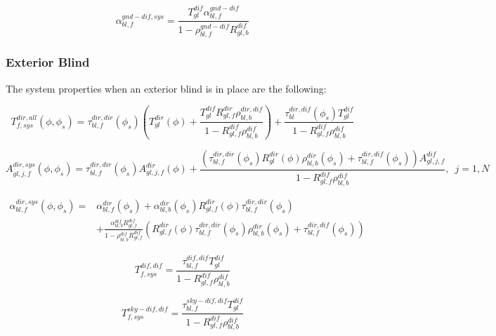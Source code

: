 \begin{equation}
\alpha_{bl,f}^{gnd - dif,sys} = \frac{{T_{gl}^{dif}\alpha_{bl,f}^{gnd - dif}}}{{1 - \rho_{bl,f}^{gnd - dif}R_{gl,b}^{dif}}}
\end{equation}

\subsubsection{Exterior Blind}\label{exterior-blind}

The system properties when an exterior blind is in place are the following:

\begin{equation}
T_{f,sys}^{dir,all}(\phi ,{\phi_s}) = \tau_{bl,f}^{dir,dir}({\phi_s})\left( {T_{gl}^{dir}(\phi ) + \frac{{T_{gl}^{dif}R_{gl,f}^{dir}\rho_{bl,b}^{dir,dif}}}{{1 - R_{gl,f}^{dif}\rho_{bl,b}^{dif}}}} \right) + \frac{{\tau_{bl}^{dir,dif}({\phi_s})T_{gl}^{dif}}}{{1 - R_{gl,f}^{dif}\rho_{bl,b}^{dif}}}
\end{equation}

\begin{equation}
A_{gl,j,f}^{dir,sys}(\phi ,\phi_s) =
     \tau_{bl,f}^{dir,dir}(\phi_s) A_{gl,j,f}^{dir}(\phi ) +
     \frac{
       \left(
         \tau_{bl,f}^{dir,dir}(\phi_s) R_{gl}^{dir}(\phi) \rho_{bl,b}^{dir}(\phi_s)+ \tau_{bl,f}^{dir,dif}(\phi_s)
       \right) A_{gl,j,f}^{dif}
     } {
       1 - R_{gl,f}^{dif}\rho_{bl,b}^{dif}
     },\;~j = 1,N
\end{equation}

\begin{equation}
\begin{split}
\alpha_{bl,f}^{dir,sys}(\phi ,\phi_s) =& \alpha_{bl,f}^{dir}(\phi_s) + \alpha_{bl,b}^{dir}(\phi_s) R_{gl,f}^{dir}(\phi) \tau_{bl,f}^{dir,dir}(\phi_s) \\
&+ \frac{\alpha_{bl,b}^{dif}R_{gl,f}^{dif}}{1 - \rho_{bl,b}^{dif} R_{gl,f}^{dif}}\left(R_{gl,f}^{dir}(\phi) \tau_{bl,f}^{dir,dir}(\phi_s) \rho_{bl,b}^{dir}(\phi_s) + \tau_{bl,f}^{dir,dif}(\phi_s) \right)
\end{split}
\end{equation}

\begin{equation}
T_{f,sys}^{dif,dif} = \frac{{\tau_{bl,f}^{dif,dif}T_{gl}^{dif}}}{{1 - R_{gl,f}^{dif}\rho_{bl,b}^{dif}}}
\end{equation}

\begin{equation}
T_{f,sys}^{sky - dif,dif} = \frac{{\tau_{bl,f}^{sky - dif,dif}T_{gl}^{dif}}}{{1 - R_{gl,f}^{dif}\rho_{bl,b}^{dif}}}
\end{equation}

